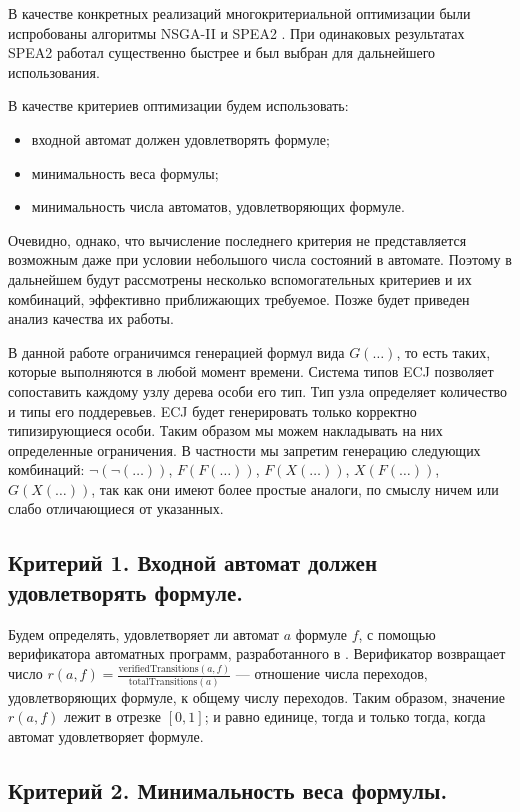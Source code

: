 \documentclass[12pt,fleqn]{article}
\begin{document}
В качестве конкретных реализаций многокритериальной оптимизации были испробованы алгоритмы NSGA-II \cite{nsga2} и SPEA2 \cite{spea2}.
При одинаковых результатах SPEA2 работал существенно быстрее и был выбран для дальнейшего использования.

В качестве критериев оптимизации будем использовать:
\begin{itemize}
\item входной автомат должен удовлетворять формуле;
\item минимальность веса формулы;
\item минимальность числа автоматов, удовлетворяющих формуле.
\end{itemize}
Очевидно, однако, что вычисление последнего
критерия не представляется возможным даже при условии небольшого числа состояний в автомате. Поэтому в дальнейшем будут
рассмотрены несколько вспомогательных критериев и их комбинаций, эффективно приближающих требуемое. Позже будет приведен
анализ качества их работы.

В данной работе ограничимся генерацией формул вида $G(\ldots)$, то есть таких, которые выполняются в любой момент времени.
Система типов ECJ позволяет сопоставить каждому узлу дерева особи его тип. Тип узла
определяет количество и типы его поддеревьев. ECJ будет генерировать только корректно типизирующиеся особи.
Таким образом мы можем накладывать на них определенные ограничения. В частности мы запретим генерацию следующих
комбинаций: $\lnot(\lnot(\ldots))$, $F(F(\ldots))$, $F(X(\ldots))$, $X(F(\ldots))$, $G(X(\ldots))$, так как
они имеют более простые аналоги, по смыслу ничем или слабо отличающиеся от указанных.

\subsection{Критерий 1. Входной автомат должен удовлетворять формуле.}

Будем определять, удовлетворяет ли автомат $a$ формуле $f$, с помощью верификатора автоматных программ, разработанного в \cite{eg}.
Верификатор возвращает число $r(a, f) = \frac{\text{verifiedTransitions}(a, f)}{\text{totalTransitions}(a)}$ --- отношение числа
переходов, удовлетворяющих формуле, к общему числу переходов. Таким образом, значение $r(a, f)$ лежит в отрезке $[0, 1]$; и равно
единице, тогда и только тогда, когда автомат удовлетворяет формуле.

\subsection{Критерий 2. Минимальность веса формулы.}
\end{document}
